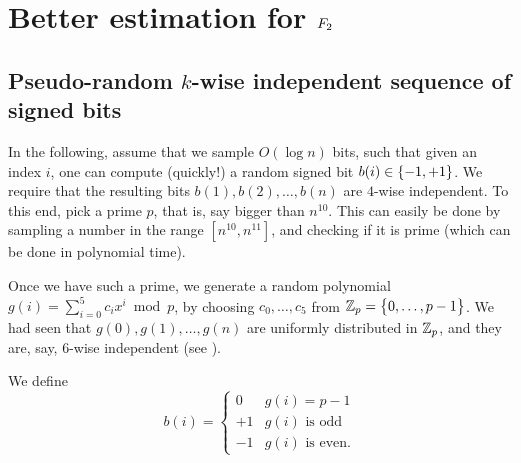 


\section{Better estimation for $F_2$}

\subsection{Pseudo-random $k$-wise independent %
   sequence of signed bits}

In the following, assume that we sample $O( \log n)$ bits, such that
given an index $i$, one can compute (quickly!) a random signed bit
$b(i) \in \left\{ {-1,+1} \right\}$. We require that the resulting bits
$b(1), b(2), \ldots, b(n)$ are $4$-wise independent.  To this end,
pick a prime $p$, that is, say bigger than $n^{10}$. This can easily
be done by sampling a number in the range $[n^{10}, n^{11}]$, and
checking if it is prime (which can be done in polynomial time).

Once we have such a prime, we generate a random polynomial
$g(i) = \sum_{i=0}^5 c_i x^i \bmod p$, by choosing $c_0, \ldots, c_5$
from $\mathbb{Z}_p = \left\{ {0, \ldots, p-1 \bigl. } \right\}$.  We had seen that
$g(0), g(1), \ldots, g(n)$ are uniformly distributed in $\mathbb{Z}_p$, and
they are, say, $6$-wise independent (see ).


We define
\begin{equation*}
    b(i)%
    =%
    \begin{cases}
        0 & g(i) = p-1 \\
        +1 & g(i) \text{ is odd}\\
        -1 & g(i) \text{ is even}.
    \end{cases}
\end{equation*}

